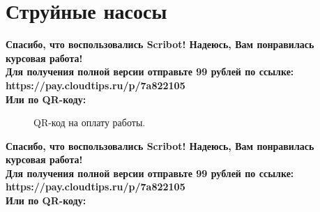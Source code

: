 \documentclass{article}
\begin{document}
\section{Струйные насосы}
\begin{center}
    \textbf{
        Спасибо, что воспользовались Scribot! Надеюсь, Вам понравилась курсовая работа!\\
        Для получения полной версии отправьте 99 рублей по ссылке:\\
        https://pay.cloudtips.ru/p/7a822105\\
        Или по QR-коду:\\
    }
\end{center}
\begin{figure}[h]
    \caption{QR-код на оплату работы.}
    \label{ris:image}
\end{figure}
\newpage
\begin{center}
    \textbf{
        Спасибо, что воспользовались Scribot! Надеюсь, Вам понравилась курсовая работа!\\
        Для получения полной версии отправьте 99 рублей по ссылке:\\
        https://pay.cloudtips.ru/p/7a822105\\
        Или по QR-коду:\\
    }
\end{center}
\end{document}
